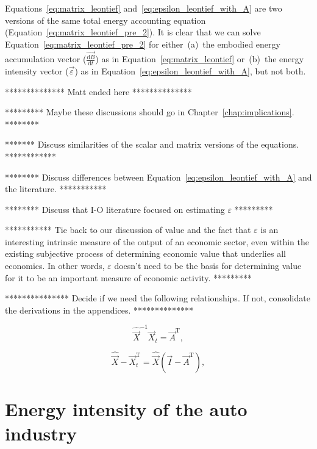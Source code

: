 Equations~\ref{eq:matrix_leontief} and~\ref{eq:epsilon_leontief_with_A}
are two versions of the same total energy 
accounting equation (Equation~\ref{eq:matrix_leontief_pre_2}).
It is clear that we can solve Equation~\ref{eq:matrix_leontief_pre_2} 
for either~(a)~the embodied energy accumulation
vector ($\vec{\frac{\mathrm{d}B}{\mathrm{d}t}}$) 
as in Equation~\ref{eq:matrix_leontief} 
or~(b)~the energy intensity vector ($\vec{\varepsilon}$) as in
Equation~\ref{eq:epsilon_leontief_with_A}, 
but not both.


************** Matt ended here **************

********* Maybe these discussions should go in Chapter~\ref{chap:implications}. ********

******* Discuss similarities of the scalar and matrix
versions of the equations. ************

******** Discuss differences between Equation~\ref{eq:epsilon_leontief_with_A}
and the literature. ***********

******** Discuss that I-O literature focused on estimating $\varepsilon$ *********

*********** Tie back to our discussion of value and the fact that
$\varepsilon$ is an interesting intrinsic measure of the 
output of an economic sector, even within the existing
subjective process of determining economic value that underlies
all economics. In other words, $\varepsilon$ doesn't 
need to be the basis for determining value for it to be an important
measure of economic activity. *********

*************** Decide if we need the following relationships. 
If not, consolidate the derivations in the appendices. **************

\begin{equation} \label{eq:Xhat_X_and_A}
	\hat{\vec{X}}^{-1}\vec{X}_{t} = \vec{A}^{\mathrm{T}},
\end{equation}

\begin{equation} \label{eq:Xdifference2}
	\hat{\vec{X}} - \vec{X}_{t}^{\mathrm{T}} = \hat{\vec{X}}(\vec{I} - \vec{A}^{\mathrm{T}}),
\end{equation}


\section{Energy intensity of the auto industry}
\label{sec:intensity_auto}

